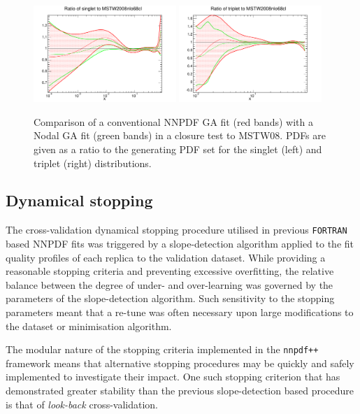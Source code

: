 \begin{figure}[!]
\centering
\includegraphics[width=0.48\textwidth]{7-PostLHC/figs/NodalGA/singlet.pdf}
\includegraphics[width=0.48\textwidth]{7-PostLHC/figs/NodalGA/triplet.pdf}
\caption[Comparison of a conventional NNPDF GA fit with a Nodal GA fit in a closure test to MSTW2008]{Comparison of a conventional NNPDF GA fit (red bands) with a Nodal GA fit (green bands) in a closure test to MSTW08. PDFs are given as a ratio to the generating PDF set for the singlet (left) and triplet (right) distributions.}
\label{fig:nodalvsnonnodal}
\end{figure}

\subsection{Dynamical stopping}
The cross-validation dynamical stopping procedure utilised in previous {\tt FORTRAN} based NNPDF fits was triggered by a slope-detection algorithm applied to the fit quality profiles of each replica to the validation dataset. While providing a reasonable stopping criteria and preventing excessive overfitting, the relative balance between the degree of under- and over-learning was governed by the parameters of the slope-detection algorithm. Such sensitivity to the stopping parameters meant that a re-tune was often necessary upon large modifications to the dataset or minimisation algorithm. 

The modular nature of the stopping criteria implemented in the {\tt nnpdf++} framework means that alternative stopping procedures may be quickly and safely implemented to investigate their impact. One such stopping criterion that has demonstrated greater stability than the previous slope-detection based procedure is that of \emph{look-back} cross-validation. 

